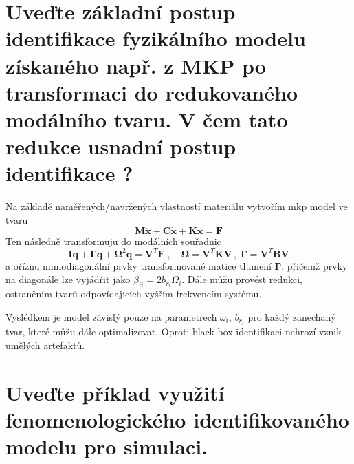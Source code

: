 \documentclass{article}
\begin{document}
	\section{Uveďte základní postup identifikace fyzikálního modelu získaného např. z MKP po transformaci do redukovaného modálního tvaru. V čem tato redukce usnadní postup identifikace ? }
	
	Na základě naměřených/navržených vlastností materiálu vytvořím mkp model ve tvaru
	\begin{equation*}
		\bm{M}\bm{\ddot{x}} + \bm{C}\bm{\dot{x}} + \bm{K}\bm{x} = \bm{F}
	\end{equation*}
	Ten následně transformuju do modálních souřadnic
	\begin{equation*}
		\bm{I}\bm{\ddot{q}} + \bm{\Gamma}\bm{\dot{q}} + \bm{\Omega}^2 \bm{q} = \bm{V}^T \bm{F}
		\;,\quad 
		\bm{\Omega} = \bm{V}^T\bm{K}\bm{V}
		\,,\;
		\bm{\Gamma} = \bm{V}^T\bm{B}\bm{V}
	\end{equation*}
	a oříznu mimodiagonální prvky transformované matice tlumení $\bm{\Gamma}$, přičemž prvky na diagonále lze vyjádřit jako $\beta_{ii} = 2 b_{r_i} \Omega_i$. Dále můžu provést redukci, ostraněním tvarů odpovídajících vyšším frekvencím systému.

	Vyslédkem je model závislý pouze na parametrech $\omega_i$, $b_{r_i}$ 	pro každý zanechaný tvar, které můžu dále optimalizovat. Oproti black-box identifikaci nehrozí vznik umělých artefaktů.

	\section{Uveďte příklad využití fenomenologického identifikovaného modelu pro simulaci. }
	
\end{document}
